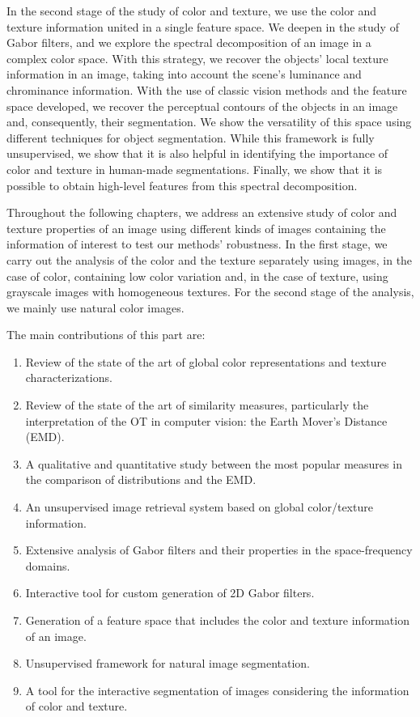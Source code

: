 In the second stage of the study of color and texture, we use the color and texture information united in a single feature space. We deepen in the study of Gabor filters, and we explore the spectral decomposition of an image in a complex color space. With this strategy, we recover the objects' local texture information in an image, taking into account the scene's luminance and chrominance information. With the use of classic vision methods and the feature space developed, we recover the perceptual contours of the objects in an image and, consequently, their segmentation. We show the versatility of this space using different techniques for object segmentation. While this framework is fully unsupervised, we show that it is also helpful in identifying the importance of color and texture in human-made segmentations. Finally, we show that it is possible to obtain high-level features from this spectral decomposition.

Throughout the following chapters, we address an extensive study of color and texture properties of an image using different kinds of images containing the information of interest to test our methods' robustness. In the first stage, we carry out the analysis of the color and the texture separately using images, in the case of color, containing low color variation and, in the case of texture, using grayscale images with homogeneous textures. For the second stage of the analysis, we mainly use natural color images. 

The main contributions of this part are:
\begin{enumerate}
	\item Review of the state of the art of global color representations and texture characterizations.
	\item Review of the state of the art of similarity measures, particularly the interpretation of the OT in computer vision: the Earth Mover's Distance (EMD).
	\item A qualitative and quantitative study between the most popular measures in the comparison of distributions and the EMD. 
	\item An unsupervised image retrieval system based on global color/texture information.
	\item Extensive analysis of Gabor filters and their properties in the space-frequency domains.
	\item Interactive tool for custom generation of 2D Gabor filters.
	\item Generation of a feature space that includes the color and texture information of an image.
	\item Unsupervised framework for natural image segmentation.
	\item A tool for the interactive segmentation of images considering the information of color and texture.
\end{enumerate}


